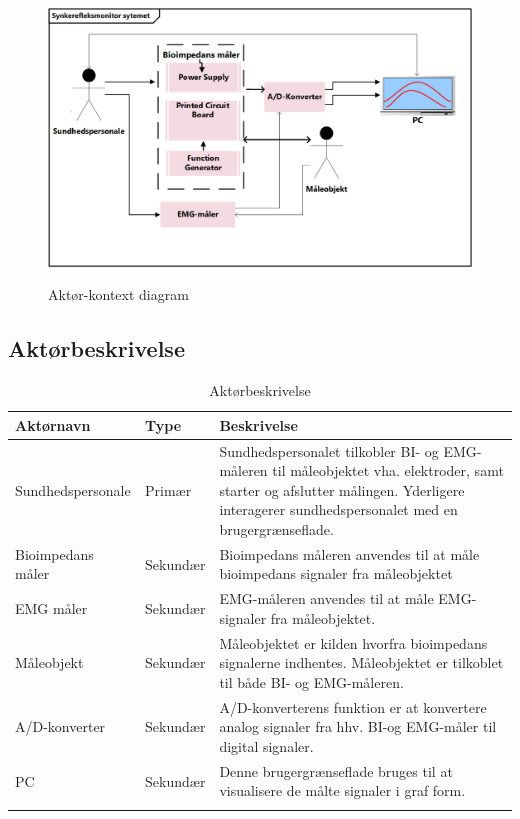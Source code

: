 \begin{figure}[H]
\centering
{\includegraphics[width=\textwidth]
{Figure/AktoerKontextDiagram}}
\caption{Aktør-kontext diagram}
\label{Use case diagram}
\end{figure}  

\subsection{Aktørbeskrivelse}
\begin{table}[H]
\begin{tabularx}{\textwidth}{l l X}
     Aktørnavn	&	Type		&	Beskrivelse \\ \midrule
     Sundhedspersonale   	&  	Primær  	& 	Sundhedspersonalet tilkobler BI- og EMG-måleren til måleobjektet vha. elektroder, samt starter og afslutter målingen. Yderligere interagerer sundhedspersonalet med en brugergrænseflade.     \\ 			  \addlinespace[2mm]
     Bioimpedans måler	&	Sekundær	& Bioimpedans måleren anvendes til at måle bioimpedans signaler fra måleobjektet  	 \\   \addlinespace[2mm]

  EMG måler	&	Sekundær	&	EMG-måleren anvendes til at måle EMG-signaler fra måleobjektet.
     \\   \addlinespace[2mm]
    
    Måleobjekt	&	Sekundær	&	Måleobjektet er kilden  hvorfra bioimpedans signalerne indhentes. Måleobjektet er tilkoblet til både BI- og EMG-måleren.
     \\   \addlinespace[2mm]
     
 A/D-konverter	&	Sekundær	&	A/D-konverterens funktion er at konvertere analog signaler fra hhv. BI-og EMG-måler  til digital signaler.
     \\   \addlinespace[2mm]      
    PC	&	Sekundær	&	Denne brugergrænseflade bruges til at visualisere de målte signaler i graf form.
     \\   \addlinespace[2mm]
     
   
     \bottomrule                                                                                                                   
    \end{tabularx}
    \caption {Aktørbeskrivelse}
    \label{tab:aktoerbeskrivelse}
	
\end{table}


